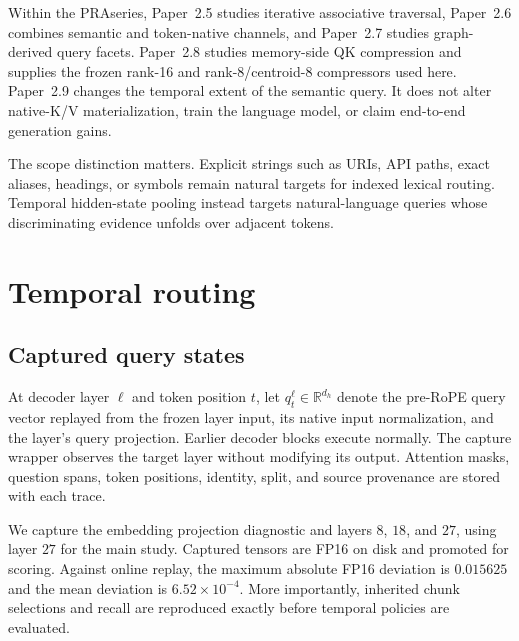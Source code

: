 \documentclass[11pt]{article}
\newcommand{\pra}{\textsc{PRA}}
\newcommand{\paperii}{Paper~2.8}
\begin{document}
Within the \pra series, Paper~2.5 studies iterative associative traversal, Paper~2.6 combines semantic and token-native channels, and Paper~2.7 studies graph-derived query facets. \paperii{} studies memory-side QK compression and supplies the frozen rank-16 and rank-8/centroid-8 compressors used here. Paper~2.9 changes the temporal extent of the semantic query. It does not alter native-K/V materialization, train the language model, or claim end-to-end generation gains.

The scope distinction matters. Explicit strings such as URIs, API paths, exact aliases, headings, or symbols remain natural targets for indexed lexical routing. Temporal hidden-state pooling instead targets natural-language queries whose discriminating evidence unfolds over adjacent tokens.

\section{Temporal routing}
\subsection{Captured query states}
At decoder layer $\ell$ and token position $t$, let $q_{t}^{\ell}\in\mathbb{R}^{d_h}$ denote the pre-RoPE query vector replayed from the frozen layer input, its native input normalization, and the layer's query projection. Earlier decoder blocks execute normally. The capture wrapper observes the target layer without modifying its output. Attention masks, question spans, token positions, identity, split, and source provenance are stored with each trace.

We capture the embedding projection diagnostic and layers $8$, $18$, and $27$, using layer $27$ for the main study. Captured tensors are FP16 on disk and promoted for scoring. Against online replay, the maximum absolute FP16 deviation is $0.015625$ and the mean deviation is $6.52\times10^{-4}$. More importantly, inherited chunk selections and recall are reproduced exactly before temporal policies are evaluated.
\end{document}
